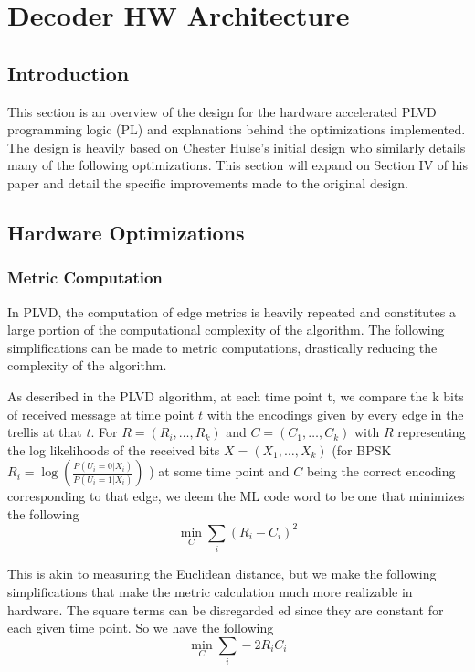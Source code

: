 
\chapter{Decoder HW Architecture}

\section{Introduction}
This section is an overview of the design for the hardware accelerated PLVD programming logic (PL) and explanations behind the optimizations implemented. The design is heavily based on Chester Hulse’s initial design \cite{ChesterPaper} who similarly details many of the following optimizations. This section will expand on Section IV of his paper and detail the specific improvements made to the original design. 


\section{Hardware Optimizations}

\subsection{Metric Computation}
In PLVD, the computation of edge metrics is heavily repeated and constitutes a large portion of the computational complexity of the algorithm. The following simplifications can be made to metric computations, drastically reducing the complexity of the algorithm. 

As described in the PLVD algorithm, at each time point t, we compare the k bits of received message at time point $t$ with the encodings given by every edge in the trellis at that $t$. 
For $R = (R_i, \ldots , R_k)$ and $C = (C_1, \ldots, C_k)$ with $R$ representing the log likelihoods of the received bits $X = (X_1, \ldots, X_k)$ (for BPSK $R_i = \log( \frac{P(U_i = 0 | X_i)}{P(U_i = 1 | X_i)})$ ) at some time point and $C$ being the correct encoding corresponding to that edge, we deem the ML code word to be one that minimizes the following
$$ \min_C \sum_i {(R_i - C_i)}^2 $$

This is akin to measuring the Euclidean distance, but we make the following simplifications that make the metric calculation much more realizable in hardware. The square terms can be disregarded ed since they are constant for each given time point. So we have the following
$$\min_C \sum_i -2 R_i C_i $$

